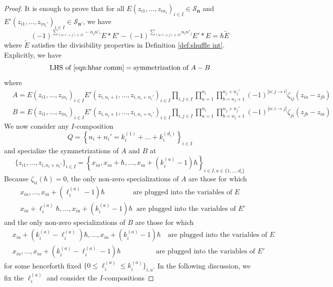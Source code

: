 \documentclass{amsart}
\def\CS{{\mathcal{S}}}
\def\bn{{\boldsymbol{n}}}
\def\edge{\Omega}
\begin{document}
\begin{proof} It is enough to prove that for all $E(z_{i1},\dots,z_{in_i})_{i \in I} \in \CS_{\bn}$ and $E'(z_{i1},\dots,z_{in_i'})_{i \in I} \in \CS_{\bn'}$, we have
\begin{equation}
\label{eqn:hbar comm}
(-1)^{\sum_{(\alpha:i\rightarrow j) \in \edge} -n_jn'_i} E*E' - (-1)^{\sum_{(\alpha:i\rightarrow j) \in \edge} n_in'_j} E'*E = \hbar \tilde{E}
\end{equation}
where $\tilde{E}$ satisfies the divisibility properties in Definition \ref{def:shuffle int}. Explicitly, we have 
$$
\text{LHS of \eqref{eqn:hbar comm}} = \text{symmetrization of }A-B
$$
where
\begin{align*}
&A=E(z_{i1},\dots,z_{in_i})_{i \in I} E'(z_{i,n_i+1},\dots,z_{i,n_i+n_i'})_{i \in I}  \prod_{i,j \in I} \prod_{a=1}^{n_i} \prod_{b={n_j+1}}^{n_j+n_j'} (-1)^{|\alpha:j\rightarrow i|} \zeta_{ij} \left( z_{ia} - z_{jb}  \right) \\  
&B=E(z_{i1},\dots,z_{in_i})_{i \in I} E'(z_{i,n_i+1},\dots,z_{i,n_i+n_i'})_{i \in I}  \prod_{i,j \in I} \prod_{a=1}^{n_i} \prod_{b={n_j+1}}^{n_j+n_j'}  (-1)^{|\alpha:i\rightarrow j|}  \zeta_{ji} \left( z_{jb} - z_{ia}  \right)   
\end{align*} 
We now consider any $I$-composition
$$
Q = \left\{n_i+n_i' = k_i^{(1)} + \dots + k_i^{(d_i)} \right\}_{i \in I}
$$
and specialize the symmetrizations of $A$ and $B$ at
$$
\Big\{z_{i1},\dots,z_{i,n_i+n_i'}\Big\}_{i \in I} = \left\{x_{ia},x_{ia}+\hbar,\dots,x_{ia}+ (k_i^{(a)}-1)\hbar \right\}_{i \in I, a \in \{1,\dots,d_i\}}
$$
Because $\zeta_{ii}(\hbar) = 0$, the only non-zero specializations of $A$ are those for which
\begin{align*} 
&x_{ia},\dots,x_{ia}+ (\ell_i^{(a)}-1)\hbar \qquad \qquad \text{are plugged into the variables of }E \\
&x_{ia}+ \ell_i^{(a)}\hbar,\dots,x_{ia} + (k_i^{(a)}-1)\hbar \ \text{ are plugged into the variables of }E'
\end{align*}
and the only non-zero specializations of $B$ are those for which
\begin{align*} 
&x_{ia}+(k_i^{(a)}-\ell_i^{(a)})\hbar,\dots,x_{ia}+ (k_i^{(a)}-1)\hbar \quad \text{are plugged into the variables of }E \\
&x_{ia},\dots,x_{ia}+ (k_i^{(a)}-\ell_i^{(a)}-1)\hbar \qquad \qquad \quad \text{are plugged into the variables of }E'
\end{align*}
for some henceforth fixed $\{0 \leq \ell_i^{(a)} \leq k_i^{(a)}\}_{i,a}$. In the following discussion, we fix the $\ell_i^{(a)}$ and consider the $I$-compositions

\end{proof}
\end{document}
